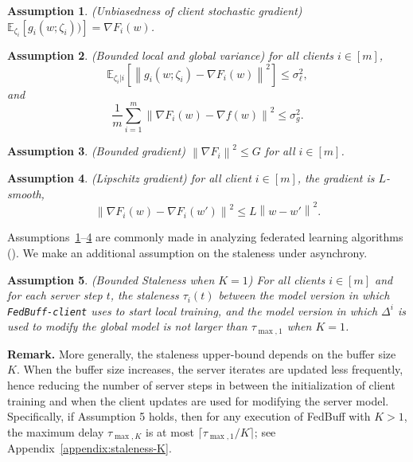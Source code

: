 \documentclass[twoside]{article}
\newtheorem{assumption}{Assumption}
\newcommand{\norm}[1]{\left\lVert#1\right\rVert}
\begin{document}
\begin{assumption}
(Unbiasedness of client stochastic gradient) $\mathbb{E}_{\zeta_i}[g_i(w ; \zeta_i))] = \nabla F_i(w)$.
\label{assumption:unbiased}
\end{assumption}
\begin{assumption}
(Bounded local and global variance) for all clients $i \in [m]$, $$\mathbb{E}_{\zeta_i|i}[\norm{g_i(w; \zeta_i) - \nabla F_i(w)}^2] \leq \sigma^2_{\ell},$$
and 
$$\frac{1}{m} \sum_{i=1}^m \norm{\nabla F_i(w) - \nabla f(w)}^2 \leq \sigma^2_{g}.$$ 
\label{assumption:bounded_var}
\end{assumption}

\begin{assumption}
(Bounded gradient) $\norm{\nabla F_i}^2 \leq G$ for all $i \in [m]$.
\label{assumption:bounded_grad}
\end{assumption}

\begin{assumption}
(Lipschitz gradient) for all client $i \in [m]$, the gradient is $L$-smooth, 
$$\norm{\nabla F_i(w) - \nabla F_i(w')}^2 \leq L \norm{w - w'}^2. $$
\label{assumption:lipz}
\end{assumption}
Assumptions~\ref{assumption:unbiased}--\ref{assumption:lipz} are commonly made in analyzing federated learning algorithms (\cite{adaptive-fl-optimization, fedavg_conv_Li, Stitch_LocalSGD, restarted_SGD_Yu}). We make an additional assumption on the staleness under asynchrony.

\begin{assumption}
(Bounded Staleness when $K=1$) For all clients $i \in [m]$ and for each server step $t$, the staleness $\tau_i(t)$ between the model version in which \texttt{FedBuff-client} uses to start local training, and the model version in which $\Delta^i$ is used to modify the global model is not larger than $\tau_{\max,1}$ when $K=1$. 
\label{assumption:staleness1}
\end{assumption}

\textbf{Remark.} More generally, the staleness upper-bound depends on the buffer size $K$. When the buffer size increases, the server iterates are updated less frequently, hence reducing the number of server steps in between the initialization of client training and when the client updates are used for modifying the server model. Specifically, if Assumption 5 holds, then for any execution of FedBuff with $K>1$, the maximum delay $\tau_{\max,K}$ is at most $\lceil \tau_{\max, 1} / K \rceil$; see Appendix~\ref{appendix:staleness-K}.
\end{document}
